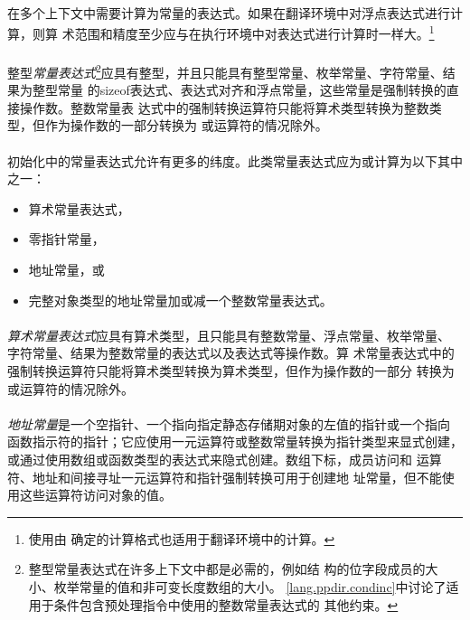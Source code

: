 {\semantic
\paragraph{}
在多个上下文中需要计算为常量的表达式。如果在翻译环境中对浮点表达式进行计算，则算
术范围和精度至少应与在执行环境中对表达式进行计算时一样大。\footnote{使用由
确定的计算格式也适用于翻译环境中的计算。}

\paragraph{}
整型\textit{常量表达式}\footnote{整型常量表达式在许多上下文中都是必需的，例如结
构的位字段成员的大小、枚举常量的值和非可变长度数组的大小。
\ref{lang.ppdir.condinc}中讨论了适用于条件包含预处理指令中使用的整数常量表达式的
其他约束。}应具有整型，并且只能具有整型常量、枚举常量、字符常量、结果为整型常量
的sizeof表达式、表达式对齐和浮点常量，这些常量是强制转换的直接操作数。整数常量表
达式中的强制转换运算符只能将算术类型转换为整数类型，但作为操作数的一部分转换为
或运算符的情况除外。

\paragraph{}
初始化中的常量表达式允许有更多的纬度。此类常量表达式应为或计算为以下其中之一：
\begin{itemize}
  \item{算术常量表达式，}
  \item{零指针常量，}
  \item{地址常量，或}
  \item{完整对象类型的地址常量加或减一个整数常量表达式。}
\end{itemize}

\paragraph{}
\textit{算术常量表达式}应具有算术类型，且只能具有整数常量、浮点常量、枚举常量、
字符常量、结果为整数常量的表达式以及表达式等操作数。算
术常量表达式中的强制转换运算符只能将算术类型转换为算术类型，但作为操作数的一部分
转换为或运算符的情况除外。

\paragraph{}
\textit{地址常量}是一个空指针、一个指向指定静态存储期对象的左值的指针或一个指向
函数指示符的指针；它应使用一元运算符\tm{\&}或整数常量转换为指针类型来显式创建，
或通过使用数组或函数类型的表达式来隐式创建。数组下标\tm{[]}，成员访问和
\tm{-\tg}运算符、地址\tm{\&}和间接寻址\tm{*}一元运算符和指针强制转换可用于创建地
址常量，但不能使用这些运算符访问对象的值。

}

